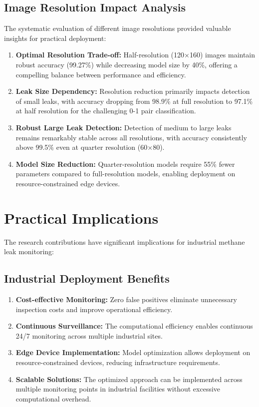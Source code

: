 \subsection{Image Resolution Impact Analysis}

The systematic evaluation of different image resolutions provided valuable insights for practical deployment:

\begin{enumerate}
\item \textbf{Optimal Resolution Trade-off:} Half-resolution (120×160) images maintain robust accuracy (99.27\%) while decreasing model size by 40\%, offering a compelling balance between performance and efficiency.

\item \textbf{Leak Size Dependency:} Resolution reduction primarily impacts detection of small leaks, with accuracy dropping from 98.9\% at full resolution to 97.1\% at half resolution for the challenging 0-1 pair classification.

\item \textbf{Robust Large Leak Detection:} Detection of medium to large leaks remains remarkably stable across all resolutions, with accuracy consistently above 99.5\% even at quarter resolution (60×80).

\item \textbf{Model Size Reduction:} Quarter-resolution models require 55\% fewer parameters compared to full-resolution models, enabling deployment on resource-constrained edge devices.
\end{enumerate}

\section{Practical Implications}

The research contributions have significant implications for industrial methane leak monitoring:

\subsection{Industrial Deployment Benefits}

\begin{enumerate}
\item \textbf{Cost-effective Monitoring:} Zero false positives eliminate unnecessary inspection costs and improve operational efficiency.

\item \textbf{Continuous Surveillance:} The computational efficiency enables continuous 24/7 monitoring across multiple industrial sites.

\item \textbf{Edge Device Implementation:} Model optimization allows deployment on resource-constrained devices, reducing infrastructure requirements.

\item \textbf{Scalable Solutions:} The optimized approach can be implemented across multiple monitoring points in industrial facilities without excessive computational overhead.
\end{enumerate}

